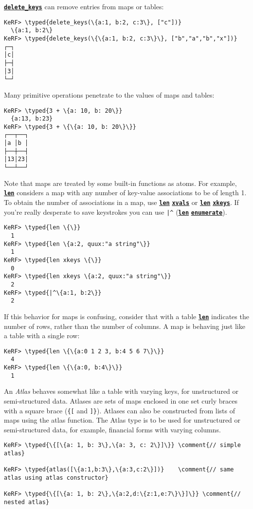 \documentclass{article}
\newcommand{\typed}[1]{\textcolor{TealBlue}{#1}}
\newcommand{\comment}[1]{\textcolor{Orange}{#1}}
\newcommand{\primu}[2]{\hyperref[prim:#2]{\textbf{\texttt{#1}}}}
\newcommand{\prim}[1]{\primu{#1}{#1}}
\begin{document}
\primu{delete\_keys}{deleteKeys} can remove entries from maps or tables:
\begin{Verbatim}
KeRF> \typed{delete_keys(\{a:1, b:2, c:3\}, ["c"])}
  \{a:1, b:2\}
KeRF> \typed{delete_keys(\{\{a:1, b:2, c:3\}\}, ["b","a","b","x"])}
┌─┐
│c│
├─┤
│3│
└─┘
\end{Verbatim}

Many primitive operations penetrate to the values of maps and tables:
\begin{Verbatim}
KeRF> \typed{3 + \{a: 10, b: 20\}}
  {a:13, b:23}
KeRF> \typed{3 + \{\{a: 10, b: 20\}\}}
┌──┬──┐
│a │b │
├──┼──┤
│13│23│
└──┴──┘
\end{Verbatim}

Note that maps are treated by some built-in functions as atoms. For example, \prim{len} considers a map with any number of key-value associations to be of length 1. To obtain the number of associations in a map, use \prim{len} \prim{xvals} or \prim{len} \prim{xkeys}. If you're really desperate to save keystrokes you can use \texttt{|\^} (\prim{len} \prim{enumerate}).
\begin{Verbatim}
KeRF> \typed{len \{\}}
  1
KeRF> \typed{len \{a:2, quux:"a string"\}}
  1
KeRF> \typed{len xkeys \{\}}
  0
KeRF> \typed{len xkeys \{a:2, quux:"a string"\}}
  2
KeRF> \typed{|^\{a:1, b:2\}}
  2
\end{Verbatim}

If this behavior for maps is confusing, consider that with a table \prim{len} indicates the number of rows, rather than the number of columns. A map is behaving just like a table with a single row:
\begin{Verbatim}
KeRF> \typed{len \{\{a:0 1 2 3, b:4 5 6 7\}\}}
  4
KeRF> \typed{len \{\{a:0, b:4\}\}}
  1
\end{Verbatim}

\vspace{0.5cm}

An \emph{Atlas} behaves somewhat like a table with varying keys, for unstructured or semi-structured data. Atlases are sets of maps enclosed in one set curly braces with a square brace (\texttt{\{[} and \texttt{]\}}). Atlases can also be constructed from lists of maps using the atlas\(\) function. The Atlas type is to be used for unstructured or semi-structured data, for example, financial forms with varying columns. 

\begin{Verbatim}
KeRF> \typed{\{[\{a: 1, b: 3\},\{a: 3, c: 2\}]\}} \comment{// simple atlas}

KeRF> \typed{atlas([\{a:1,b:3\},\{a:3,c:2\}])}    \comment{// same atlas using atlas constructor}
     
KeRF> \typed{\{[\{a: 1, b: 2\},\{a:2,d:\{z:1,e:7\}\}]\}} \comment{// nested atlas}

\end{Verbatim}
\end{document}
